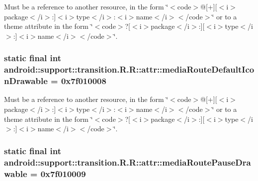 Must be a reference to another resource, in the form \char`\"{}$<$code$>$@\mbox{[}+\mbox{]}\mbox{[}$<$i$>$package$<$/i$>$:\mbox{]}$<$i$>$type$<$/i$>$:$<$i$>$name$<$/i$>$$<$/code$>$\char`\"{} or to a theme attribute in the form \char`\"{}$<$code$>$?\mbox{[}$<$i$>$package$<$/i$>$:\mbox{]}\mbox{[}$<$i$>$type$<$/i$>$:\mbox{]}$<$i$>$name$<$/i$>$$<$/code$>$\char`\"{}. \hypertarget{classandroid_1_1support_1_1transition_1_1_r_1_1attr_bb55aee2e63a9a13cdca814a119fa901}{
\subsubsection[{mediaRouteDefaultIconDrawable}]{\setlength{\rightskip}{0pt plus 5cm}static final int android::support::transition.R.R::attr::mediaRouteDefaultIconDrawable = 0x7f010008}}
\label{classandroid_1_1support_1_1transition_1_1_r_1_1attr_bb55aee2e63a9a13cdca814a119fa901}


Must be a reference to another resource, in the form \char`\"{}$<$code$>$@\mbox{[}+\mbox{]}\mbox{[}$<$i$>$package$<$/i$>$:\mbox{]}$<$i$>$type$<$/i$>$:$<$i$>$name$<$/i$>$$<$/code$>$\char`\"{} or to a theme attribute in the form \char`\"{}$<$code$>$?\mbox{[}$<$i$>$package$<$/i$>$:\mbox{]}\mbox{[}$<$i$>$type$<$/i$>$:\mbox{]}$<$i$>$name$<$/i$>$$<$/code$>$\char`\"{}. \hypertarget{classandroid_1_1support_1_1transition_1_1_r_1_1attr_9026d1a6b19ce0743f229f551a44965b}{
\subsubsection[{mediaRoutePauseDrawable}]{\setlength{\rightskip}{0pt plus 5cm}static final int android::support::transition.R.R::attr::mediaRoutePauseDrawable = 0x7f010009}}
\label{classandroid_1_1support_1_1transition_1_1_r_1_1attr_9026d1a6b19ce0743f229f551a44965b}


